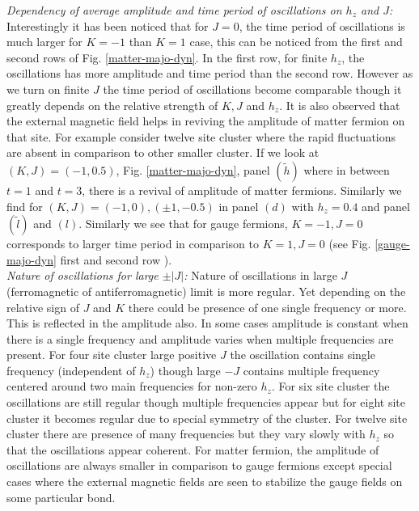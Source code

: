 \documentclass[aps,amsmath,twocolumn,amssymb,floatfix,showpacs,superscriptaddress,nofootinbib,longbibliography]{revtex4-1}
\begin{document}
{\small {\it {Dependency of average amplitude and time period of oscillations on $h_z$ and $J$:}}}
Interestingly it has been noticed that for $J=0$, the time period of oscillations is much larger  for $K=-1$ than $K=1$ case, this can be noticed from the first and second rows of Fig. \ref{matter-majo-dyn}. In the first row, for finite $h_z$, the oscillations has more amplitude and time period than the second row.  However as we turn on finite $J$ the time period of oscillations become comparable though it greatly depends on the relative strength of $K, J$ and $h_z$.  It is also observed that the external magnetic field helps in reviving the amplitude of matter fermion on that site. For example consider twelve site cluster where the rapid fluctuations are absent in comparison to other smaller cluster. If we look at $(K,J)=(-1,0.5)$, Fig. \ref{matter-majo-dyn}, panel $(\tilde{h})$  where in between $t=1$ and $t=3$, there is a revival of amplitude of matter fermions. Similarly we find for   $ (K, J)=(-1,0), (\pm1,-0.5)$ in panel $(d)$ with $h_z=0.4$ and panel $(\tilde{l})$ and $(l)$. Similarly we see that for gauge fermions, $K=-1, J=0$ corresponds to larger time period in comparison to $K=1, J=0$ (see Fig. \ref{gauge-majo-dyn} first and second row ).\\

\indent
{\small {\it {Nature of oscillations for large $\pm |J|$:}}}
Nature of oscillations in large $J$ (ferromagnetic of antiferromagnetic) limit is more regular. Yet depending on the relative sign of $J$ and $K$ there could be presence of one single frequency or more. This is reflected in the amplitude also. In some cases amplitude is constant when there is a single frequency and amplitude varies when multiple frequencies are present. For four site cluster large positive $J$ the oscillation  contains single frequency (independent of $h_z$) though large $-J$ contains multiple frequency centered around two main frequencies for non-zero $h_z$. For six site cluster the oscillations are still regular though multiple frequencies appear but for eight site cluster it becomes regular due to special symmetry of the cluster. For twelve site cluster there are presence of many frequencies but they vary slowly with $h_z$ so that the oscillations appear coherent. For matter fermion, the amplitude of oscillations are always smaller in comparison to gauge fermions except special cases where the external magnetic fields are seen to stabilize the gauge fields on some particular bond. \\
\indent
\end{document}
